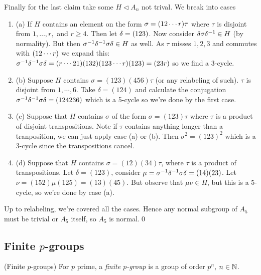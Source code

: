 \documentclass{article}
\newcommand{\nrm}{\triangleleft}
\begin{document}
\par
Finally for the last claim take some $ H\nrm A_n $ not trival. We break into cases
\begin{enumerate}
	\item (a) If $ H $ contains an element on the form $ \sigma=(1\space 2\cdots r)\tau $ where $ \tau $ is disjoint from $ 1,\dots, r, $ and $ r\ge 4 $. Then let $ \delta = (1\space2\space3) $. Now consider $ \delta\sigma{\delta}^{-1}\in H $ (by normality). But then $ {\sigma}^{-1}{\delta}^{-1}\sigma\delta\in H $ as well. As $ \tau $ misses $ 1,2,3 $ and commutes with $ (1\space2\cdots r) $ we expand this: $ {\sigma}^{-1}{\delta}^{-1}\sigma\delta=(r\cdots 2\space 1)(1\space 3\space 2)(1\space 2\space 3\cdots r)(1\space 2\space 3)=(2\space 3\space r) $ so we find a 3-cycle.
	\item (b) Suppose $ H $ contains $ \sigma=(123)(456)\tau $ (or any relabeling of such). $ \tau $ is disjoint from $ 1,\cdots,6 $. Take $ \delta = (124) $ and calculate the conjugation $ {\sigma}^{-1}{\delta}^{-1}\sigma\delta=(124236) $ which is a 5-cycle so we're done by the first case.
	\item (c) Suppose that $ H $ contains $ \sigma $ of the form $ \sigma = (123)\tau $ where $ \tau $ is a product of disjoint transpositions. Note if $ \tau $ contains anything longer than a tranposition, we can just apply case (a) or (b). Then $ \sigma^2=(123)^2 $ which is a 3-cycle since the transpositions cancel.
	\item (d) Suppose that $ H $ contains $ \sigma=(12)(34)\tau $, where $ \tau $ is a product of transpositions. Let $ \delta = (123) $, consider $ \mu = {\sigma}^{-1}{\delta}^{-1}\sigma\delta=(14)(23) $. Let $ \nu = (152)\mu(125) = (13)(45) $. But observe that $ \mu\nu\in H $, but this is a 5-cycle, so we're done by case (a).
\end{enumerate} 
Up to relabeling, we're covered all the cases. Hence any normal subgroup of $ A_5 $ must be trivial or $ A_5 $ itself, so $ A_5 $ is normal.\qed
\subsection{Finite $p$-groups}
\begin{definition}
	(Finite $ p $-groups) For $ p $ prime, a \textit{finite $ p $-group} is a group of order $ p^n $, $ n\in\mathbb{N} $.
\end{definition}
\end{document}
